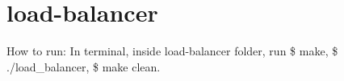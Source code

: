 \chapter{load-\/balancer }
\hypertarget{md__r_e_a_d_m_e}{}\label{md__r_e_a_d_m_e}
\label{md__r_e_a_d_m_e_autotoc_md0}%
%


How to run\+: In terminal, inside load-\/balancer folder, run {\ttfamily \$ make}, {\ttfamily \$ ./load\+\_\+balancer}, {\ttfamily \$ make clean}. 